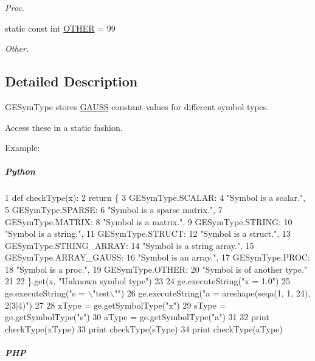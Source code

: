 \begin{DoxyCompactItemize}
\begin{DoxyCompactList}\small\item\em Proc. \end{DoxyCompactList}\item 
\hypertarget{struct_g_e_sym_type__s_ae27a11fce0f32a022df8925068b4257c}{static const int \hyperlink{struct_g_e_sym_type__s_ae27a11fce0f32a022df8925068b4257c}{O\-T\-H\-E\-R} = 99}\label{struct_g_e_sym_type__s_ae27a11fce0f32a022df8925068b4257c}

\begin{DoxyCompactList}\small\item\em Other. \end{DoxyCompactList}\end{DoxyCompactItemize}


\subsection{Detailed Description}
G\-E\-Sym\-Type stores \hyperlink{class_g_a_u_s_s}{G\-A\-U\-S\-S} constant values for different symbol types. 

Access these in a static fashion.

Example\-:

\subparagraph*{Python}


\begin{DoxyCode}
1 \textcolor{keyword}{def }checkType(x):
2     \textcolor{keywordflow}{return} \{
3         GESymType.SCALAR:
4             \textcolor{stringliteral}{"Symbol is a scalar."},
5         GESymType.SPARSE:
6             \textcolor{stringliteral}{"Symbol is a sparse matrix."},
7         GESymType.MATRIX:
8             \textcolor{stringliteral}{"Symbol is a matrix."},
9         GESymType.STRING:
10             \textcolor{stringliteral}{"Symbol is a string."},
11         GESymType.STRUCT:
12             \textcolor{stringliteral}{"Symbol is a struct."},
13         GESymType.STRING\_ARRAY:
14             \textcolor{stringliteral}{"Symbol is a string array."},
15         GESymType.ARRAY\_GAUSS:
16             \textcolor{stringliteral}{"Symbol is an array."},
17         GESymType.PROC:
18             \textcolor{stringliteral}{"Symbol is a proc."},
19         GESymType.OTHER:
20             \textcolor{stringliteral}{"Symbol is of another type."}
21 
22         \}.get(x, \textcolor{stringliteral}{"Unknown symbol type"})
23 
24 ge.executeString(\textcolor{stringliteral}{"x = 1.0"})
25 ge.executeString(\textcolor{stringliteral}{"s = \(\backslash\)"test\(\backslash\)""})
26 ge.executeString(\textcolor{stringliteral}{"a = areshape(seqa(1, 1, 24), 2|3|4)"})
27 
28 xType = ge.getSymbolType(\textcolor{stringliteral}{"x"})
29 sType = ge.getSymbolType(\textcolor{stringliteral}{"s"})
30 aType = ge.getSymbolType(\textcolor{stringliteral}{"a"})
31 
32 \textcolor{keywordflow}{print} checkType(xType)
33 \textcolor{keywordflow}{print} checkType(sType)
34 \textcolor{keywordflow}{print} checkType(aType)
\end{DoxyCode}
 \subparagraph*{P\-H\-P}


